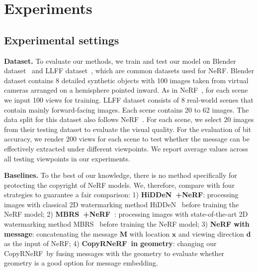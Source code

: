 \documentclass[10pt,twocolumn,letterpaper]{article}
\def\CopyNeRF{CopyRNeRF~}
\begin{document}
\section{Experiments}
\subsection{Experimental settings}
\noindent\textbf{Dataset.} To evaluate our methods, we train and test our model on Blender dataset~\cite{nerf2020} and LLFF dataset~\cite{mildenhall2019local}, which are common datasets used for NeRF. Blender dataset contains 8 detailed synthetic objects with 100 images taken from virtual cameras arranged on a hemisphere pointed inward. As in NeRF~\cite{nerf2020}, for each scene we input 100 views for training. LLFF dataset consists of 8 real-world scenes that contain mainly forward-facing images. Each scene contains 20 to 62 images. The data split for this dataset also follows NeRF~\cite{nerf2020}. For each scene, we select $20$ images from their testing dataset to evaluate the visual quality. For the evaluation of bit accuracy, we render $200$ views for each scene to test whether the message can be effectively extracted under different viewpoints. We report average values across all testing viewpoints in our experiments.

\noindent\textbf{Baselines.} To the best of our knowledge, there is no method specifically for protecting the copyright of NeRF models. We, therefore, compare with four strategies to guarantee a fair comparison: 1) \textbf{HiDDeN~\cite{zhu2018hidden}+NeRF\cite{nerf2020}}: processing images with classical 2D watermarking method HiDDeN~\cite{zhu2018hidden} before training the NeRF model; 2) \textbf{MBRS~\cite{jia2021mbrs}+NeRF~\cite{nerf2020}}: processing images with state-of-the-art 2D watermarking method MBRS~\cite{jia2021mbrs} before training the NeRF model; 3) \textbf{NeRF with message}: concatenating the message $\mathbf{M}$ with location $\mathbf{x}$ and viewing direction $\mathbf{d}$ as the input of NeRF; 4) \textbf{\CopyNeRF in geometry}: changing our \CopyNeRF by fusing messages with the geometry to evaluate whether geometry is a good option for message embedding. %

\end{document}
